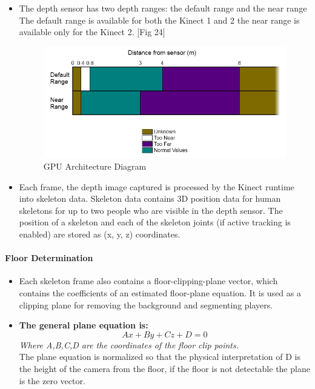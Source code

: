 \documentclass[a4paper,10pt]{article}
\begin{document}
\begin{itemize}
\item The depth sensor has two depth ranges: the default range and the near range The default range is available for both the Kinect 1 and 2 the near range is available only for the Kinect 2. [Fig 24]
\begin{figure}[H] %
	\includegraphics[width=\linewidth,height=\paperheight,keepaspectratio]{kinectRange.png}
	\caption{GPU Architecture Diagram}
	\label{fig:kinectRange}
	\end{figure}
\item Each frame, the depth image captured is processed by the Kinect runtime into skeleton data. Skeleton data contains 3D position data for human skeletons for up to two people who
are visible in the depth sensor. The position of a skeleton and each of the skeleton joints (if active tracking is enabled) are stored as (x, y, z) coordinates.

\end{itemize}
	
\paragraph{Floor Determination}
\begin{itemize}
 
\item Each skeleton frame also contains a floor-clipping-plane vector, which contains the coefficients of an estimated floor-plane equation. It is used as a clipping plane for
removing the background and segmenting players.
\item \textbf{The general plane equation is:}
\begin{equation}
  Ax + By + Cz + D = 0 
\end{equation}
 \textit{Where A,B,C,D are the coordinates of the floor clip points.}~\\
The plane equation is normalized so that the physical interpretation of D is the height of the camera from the floor, if the floor is not detectable 
the plane is the zero vector.

\end{itemize}
\end{document}
